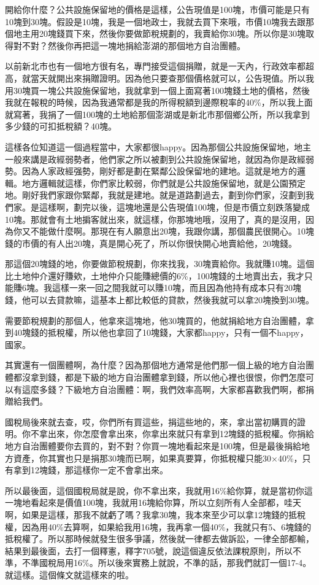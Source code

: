 \documentclass[]{ctexbook}
\begin{document}
開給你什麼？公共設施保留地的價格是這樣，公告現值是100塊，市價可能是只有10塊到30塊。假設是10塊，我是一個地政士，我就去買下來哦，市價10塊我去跟那個地主用20塊錢買下來，然後你要做節稅規劃的，我賣給你30塊。所以你是30塊取得對不對？然後你再把這一塊地捐給澎湖的那個地方自治團體。

以前新北市也有一個地方很有名，專門接受這個捐贈，就是一天內，行政效率都超高，就當天就開出來捐贈證明。因為他只要查那個價格就可以，公告現值。所以我用30塊買一塊公共設施保留地，我就拿到一個上面寫著100塊錢土地的價格，然後我就在報稅的時候，因為我通常都是我的所得稅額到邊際稅率的40\%，所以我上面就寫著，我捐了一個100塊的土地給那個澎湖或是新北市那個鄉公所，所以我拿到多少錢的可扣抵稅額？40塊。

這樣各位知道這一個過程當中，大家都很happy。因為那個公共設施保留地，地主一般來講是政經弱勢者，他們家之所以被劃到公共設施保留地，就因為你是政經弱勢。因為人家政經强勢，剛好都是劃在緊鄰公設保留地的建地。這就是地方的邏輯。地方邏輯就這樣，你們家比較弱，你們就是公共設施保留地，就是公園預定地。剛好我們家跟你緊鄰，我就是建地。就是道路劃過去，劃到你們家，沒劃到我們家。是這樣啊，劃完以後，這塊地還是公告現值100塊，但是市價立刻跌落變成10塊。那就會有土地掮客就出來，就這樣，你那塊地哦，沒用了，真的是沒用，因為你又不能做什麼啊。那現在有人願意出20塊，我跟你講，那個農民很開心。10塊錢的市價的有人出20塊，真是開心死了，所以你很快開心地賣給他，20塊錢。

那這個20塊錢的地，你要做節稅規劃，你來找我，30塊賣給你。我就賺10塊。這個比土地仲介還好賺欸，土地仲介只能賺總價的6\%，100塊錢的土地賣出去，我才只能賺6塊。我這樣一來一回之間我就可以賺10塊，而且因為他持有成本只有20塊錢，他可以去貸款嘛，這基本上都比較低的貸款，然後我就可以拿20塊換到30塊。

需要節稅規劃的那個人，他拿來這塊地，他30塊買的，他就捐給地方自治團體，拿到40塊錢的抵稅權，所以他也拿回了10塊錢，大家都happy，只有一個不happy，國家。

其實還有一個團體啊，為什麼？因為那個地方通常是他們那一個上級的地方自治團體都沒拿到錢，都是下級的地方自治團體拿到錢，所以他心裡也很恨，你們怎麼可以有這麼多錢？下級地方自治團體：啊，我們效率高啊，大家都喜歡我們啊，都捐贈給我們。

國稅局後來就去查，哎，你們所有買這些，捐這些地的，來，拿出當初購買的證明。你不拿出來，你怎麼會拿出來，你拿出來就只有拿到12塊錢的抵稅權。你捐給地方自治團體要你去買的，對不對？你買一塊地看起來是100塊，但是最後捐給地方資產，你其實也只是捐那30塊而已啊，如果真要算，你抵稅權只能30×40\%，只有拿到12塊錢，那這樣你一定不會拿出來。

所以最後面，這個國稅局就是說，你不拿出來，我就用16\%給你算，就是當初你這一塊地看起來是價值100塊，我就用16塊給你算，所以立刻所有人全部都，哇天啊，如果是這樣，那我不就虧了嗎？我拿30塊，我本來至少可以拿12塊錢的抵稅權，因為用40\%去算啊，如果給我用16塊，我再拿一個40\%，我就只有5、6塊錢的抵稅權了。所以那時候就發生很多爭議，然後就一律都去做訴訟，一律全部都輸，結果到最後面，去打一個釋憲，釋字705號，說這個違反依法課稅原則，所以不準，不準國稅局用16\%。所以後來實務上就說，不準的話，那我們就訂一個17-4。就這樣。這個條文就這樣來的啦。
\end{document}
